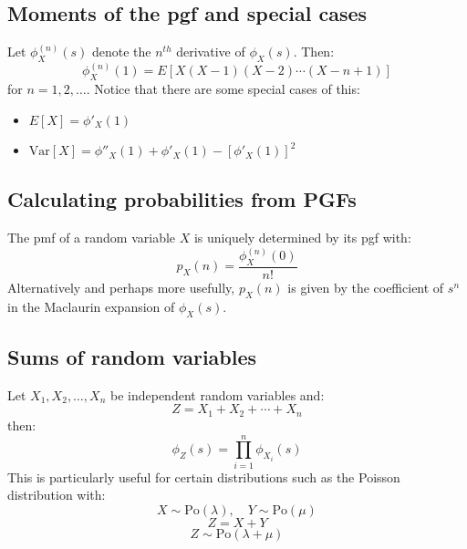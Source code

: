 \documentclass[12pt]{article}
\newcommand{\Var}[1]{\text{Var}[#1]}
\begin{document}
\subsection*{Moments of the pgf and special cases}
Let \(\phi^{(n)}_X(s)\) denote the \(n^{th}\) derivative of \(\phi_X(s)\). Then:
\[\phi^{(n)}_X(1)=E[X(X-1)(X-2)\cdots(X-n+1)]\]
for \(n=1,2,\dots\). Notice that there are some special cases of this:
\begin{itemize}
    \item \(E[X]=\phi'_X(1)\)
    \item \(\Var{X}=\phi''_X(1)+\phi'_X(1)-[\phi'_X(1)]^2\)
\end{itemize}
\subsection*{Calculating probabilities from PGFs}
The pmf of a random variable \(X\) is uniquely determined by its pgf with:
\[p_X(n)=\frac{\phi^{(n)}_X(0)}{n!}\]
Alternatively and perhaps more usefully, \(p_X(n)\) is given by the coefficient of \(s^n\) in the Maclaurin expansion of \(\phi_X(s)\).
\subsection*{Sums of random variables}
Let \(X_1,X_2,\dots,X_n\) be independent random variables and:
\[Z=X_1+X_2+\cdots+X_n\]
then:
\[\phi_Z(s)=\prod^n_{i=1}\phi_{X_i}(s)\]
This is particularly useful for certain distributions such as the Poisson distribution with:
\[X\sim \text{Po}(\lambda),\quad Y\sim\text{Po}(\mu)\]
\[Z=X+Y\]
\[Z\sim \text{Po}(\lambda+\mu)\]
\end{document}
